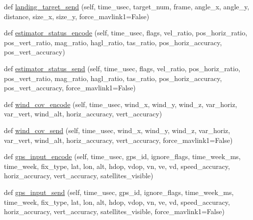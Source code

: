 \begin{DoxyCompactItemize}
\item 
def \hyperlink{classpymavlink_1_1dialects_1_1v10_1_1MAVLink_ab93f9fa81a13bf2a8fba16e7dd4dbad4}{landing\+\_\+target\+\_\+send} (self, time\+\_\+usec, target\+\_\+num, frame, angle\+\_\+x, angle\+\_\+y, distance, size\+\_\+x, size\+\_\+y, force\+\_\+mavlink1=False)
\item 
def \hyperlink{classpymavlink_1_1dialects_1_1v10_1_1MAVLink_a5303acc5733d8b2c37131c2fa76e0d72}{estimator\+\_\+status\+\_\+encode} (self, time\+\_\+usec, flags, vel\+\_\+ratio, pos\+\_\+horiz\+\_\+ratio, pos\+\_\+vert\+\_\+ratio, mag\+\_\+ratio, hagl\+\_\+ratio, tas\+\_\+ratio, pos\+\_\+horiz\+\_\+accuracy, pos\+\_\+vert\+\_\+accuracy)
\item 
def \hyperlink{classpymavlink_1_1dialects_1_1v10_1_1MAVLink_ae540163fd6b4b1ee8534143aa26b0cab}{estimator\+\_\+status\+\_\+send} (self, time\+\_\+usec, flags, vel\+\_\+ratio, pos\+\_\+horiz\+\_\+ratio, pos\+\_\+vert\+\_\+ratio, mag\+\_\+ratio, hagl\+\_\+ratio, tas\+\_\+ratio, pos\+\_\+horiz\+\_\+accuracy, pos\+\_\+vert\+\_\+accuracy, force\+\_\+mavlink1=False)
\item 
def \hyperlink{classpymavlink_1_1dialects_1_1v10_1_1MAVLink_a6c527e8921d0106f1df4e50e2fe2c3a0}{wind\+\_\+cov\+\_\+encode} (self, time\+\_\+usec, wind\+\_\+x, wind\+\_\+y, wind\+\_\+z, var\+\_\+horiz, var\+\_\+vert, wind\+\_\+alt, horiz\+\_\+accuracy, vert\+\_\+accuracy)
\item 
def \hyperlink{classpymavlink_1_1dialects_1_1v10_1_1MAVLink_ad8ddd7b9c248fec335bcdc69b0d91c06}{wind\+\_\+cov\+\_\+send} (self, time\+\_\+usec, wind\+\_\+x, wind\+\_\+y, wind\+\_\+z, var\+\_\+horiz, var\+\_\+vert, wind\+\_\+alt, horiz\+\_\+accuracy, vert\+\_\+accuracy, force\+\_\+mavlink1=False)
\item 
def \hyperlink{classpymavlink_1_1dialects_1_1v10_1_1MAVLink_a0161b03e6345d13f2ed8b50bcd9ece39}{gps\+\_\+input\+\_\+encode} (self, time\+\_\+usec, gps\+\_\+id, ignore\+\_\+flags, time\+\_\+week\+\_\+ms, time\+\_\+week, fix\+\_\+type, lat, lon, alt, hdop, vdop, vn, ve, vd, speed\+\_\+accuracy, horiz\+\_\+accuracy, vert\+\_\+accuracy, satellites\+\_\+visible)
\item 
def \hyperlink{classpymavlink_1_1dialects_1_1v10_1_1MAVLink_ad4ccec5cb80f27a2318f4860d976624d}{gps\+\_\+input\+\_\+send} (self, time\+\_\+usec, gps\+\_\+id, ignore\+\_\+flags, time\+\_\+week\+\_\+ms, time\+\_\+week, fix\+\_\+type, lat, lon, alt, hdop, vdop, vn, ve, vd, speed\+\_\+accuracy, horiz\+\_\+accuracy, vert\+\_\+accuracy, satellites\+\_\+visible, force\+\_\+mavlink1=False)

\end{DoxyCompactItemize}
